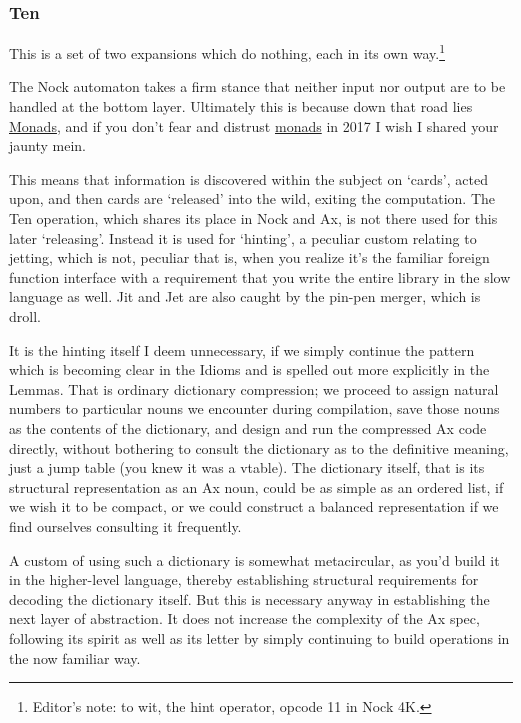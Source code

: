 \documentclass[twoside]{article}
\begin{document}
\subsubsection{Ten}

This is a set of two expansions which do nothing, each in its own way.\footnote{Editor's note:  to wit, the hint operator, opcode 11 in Nock 4K.}

The Nock automaton takes a firm stance that neither input nor output are to be handled at the bottom layer. Ultimately this is because down that road lies \href{https://wiki.haskell.org/Monad}{Monads}, and if you don't fear and distrust \href{https://en.wikipedia.org/wiki/Monad}{monads} in 2017 I wish I shared your jaunty mein.

This means that information is discovered within the subject on `cards', acted upon, and then cards are `released' into the wild, exiting the computation. The Ten operation, which shares its place in Nock and Ax, is not there used for this later `releasing'. Instead it is used for `hinting', a peculiar custom relating to jetting, which is not, peculiar that is, when you realize it's the familiar foreign function interface with a requirement that you write the entire library in the slow language as well. Jit and Jet are also caught by the pin-pen merger, which is droll.

It is the hinting itself I deem unnecessary, if we simply continue the pattern which is becoming clear in the Idioms and is spelled out more explicitly in the Lemmas. That is ordinary dictionary compression; we proceed to assign natural numbers to particular nouns we encounter during compilation, save those nouns as the contents of the dictionary, and design and run the compressed Ax code directly, without bothering to consult the dictionary as to the definitive meaning, just a jump table (you knew it was a vtable). The dictionary itself, that is its structural representation as an Ax noun, could be as simple as an ordered list, if we wish it to be compact, or we could construct a balanced representation if we find ourselves consulting it frequently.

A custom of using such a dictionary is somewhat metacircular, as you'd build it in the higher-level language, thereby establishing structural requirements for decoding the dictionary itself. But this is necessary anyway in establishing the next layer of abstraction. It does not increase the complexity of the Ax spec, following its spirit as well as its letter by simply continuing to build operations in the now familiar way.
\end{document}
